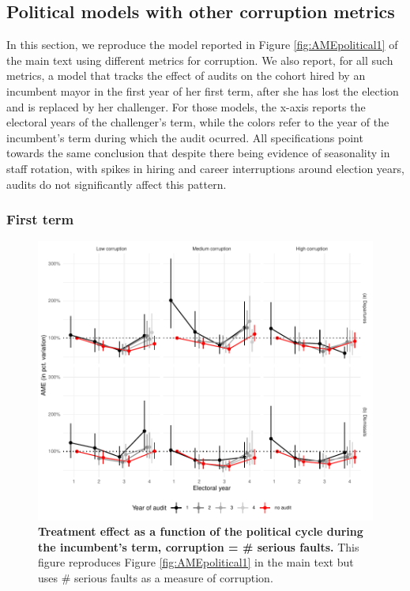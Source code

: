 \documentclass[12pt,a4paper]{article}
\theoremstyle{definition}
\begin{document}
{\subsection{Political models with other corruption metrics}
\label{app:political}

In this section, we reproduce the model reported in Figure \ref{fig:AMEpolitical1} of the main text using different metrics for corruption. We also report, for all such metrics, a model that tracks the effect of audits on the cohort hired by an incumbent mayor in the first year of her first term, after she has lost the election and is replaced by her challenger. For those models, the x-axis reports the electoral years of the challenger's term, while the colors refer to the year of the incumbent's term during which the audit ocurred. All specifications point towards the same conclusion that despite there being evidence of seasonality in staff rotation, with spikes in hiring and career interruptions around election years, audits do not significantly affect this pattern. 

\subsubsection*{First term}

 \begin{figure}[H]
     \centering
     \includegraphics{figures/AMEpoliticalSerious_term1Client.pdf}
     \caption{{\bf Treatment effect as a function of the political cycle during the incumbent's term, corruption = \# serious faults.} This figure reproduces Figure \ref{fig:AMEpolitical1} in the main text but uses \# serious faults as a measure of corruption.}
     \label{fig:AMEpolitical1_serious}
 \end{figure}

}
\end{document}
